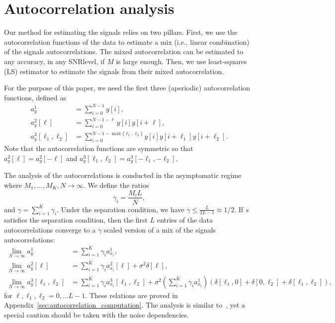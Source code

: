 \documentclass[english]{article}
\numberwithin{equation}{section}
\theoremstyle{plain}
\theoremstyle{definition}
\theoremstyle{remark}
\theoremstyle{plain}
\theoremstyle{remark}
\theoremstyle{plain}
\theoremstyle{plain}
\newcommand{\SNR}{{\textsf{SNR}}}
\begin{document}
\section{Autocorrelation analysis}   \label{sec:autocorrelation}

Our method for estimating the signals relies on two pillars. 
First, we use the autocorrelation functions of the data to estimate a mix (i.e., linear combination) of the signals autocorrelations. The mixed autocorrelation can be estimated to any accuracy, in any \SNR level, if $M$ is large enough. Then, we use least-squares (LS) estimator to estimate the signals from their mixed autocorrelation. 

For the purpose of this paper, we need the first three (aperiodic) autocorrelation functions, defined as
\begin{align} \label{eq:autocorrelations}
a_y^1 &= \sum_{i=0}^{N-1} y[i], \nonumber\\
a_y^2[\ell] &= \sum_{i=0}^{N-1-\ell} y[i]y[i+\ell], \nonumber\\
a_y^3[\ell_1,\ell_2] &= \sum_{i=0}^{N-1-\max\{\ell_1,\ell_2\}} y[i]y[i+\ell_1]y[i+\ell_2]. 
\end{align}
Note that the autocorrelation functions are symmetric so that $a_y^2[\ell] = a_y^2[-\ell]$ and $a_y^3[\ell_1,\ell_2] = a_y^3[-\ell_1,-\ell_2]$.

The analysis of the autocorrelations is conducted in the asymptomatic regime where $M_1,\ldots,M_K,N\to\infty$. We define the ratios 
\begin{equation}
\gamma_i = \frac{M_i L}{N},
\end{equation}
and $\gamma = \sum_{i=1}^K\gamma_i$.
Under the separation condition, we have $\gamma\leq\frac{L}{2L-1}\approx 1/2$.
If $s$ satisfies the separation condition, then the first $L$ entries of the data autocorrelations converge to a $\gamma$ scaled version of a mix of the signals autocorrelations:
\begin{align}
\lim_{N\to\infty} a_y^1 &= \sum_{i=1}^K\gamma_i a_{x_i}^1, \\
\lim_{N\to\infty} a_y^2[\ell] &= \sum_{i=1}^K\gamma_i a_{x_i}^2[\ell] +\sigma^2\delta[\ell],\\
\lim_{N\to\infty} a_y^3[\ell_1,\ell_2] &= \sum_{i=1}^K\gamma_i a_{x_i}^3[\ell_1,\ell_2] + \sigma^2\left(\sum_{i=1}^K\gamma_i a_{x_i}^1\right)(\delta[\ell_1,0]+\delta[0,\ell_2]+\delta[\ell_1,\ell_2]),
\end{align}
for $\ell,\ell_1,\ell_2=0,\ldots L-1$.
These relations are proved in Appendix~\ref{sec:autocorrelation_computation}. The analysis is similar to~\cite{bendory2017bispectrum,boumal2017heterogeneous}, yet a special caution should be taken with the noise dependencies. 
\end{document}

